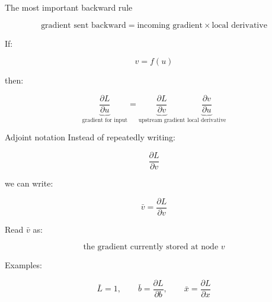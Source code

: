 \documentclass[10pt,aspectratio=169]{beamer}
\newcommand{\grad}[2]{\frac{\partial #1}{\partial #2}}
\newcommand{\adj}[1]{\bar{#1}}
\begin{document}
\begin{frame}[t]{The most important backward rule}
\begin{center}
\Large
\[
\boxed{
\text{gradient sent backward}
=
\text{incoming gradient}
\times
\text{local derivative}
}
\]
\end{center}

\vspace{0.35cm}

If:

\[
v=f(u)
\]

then:

\[
\underbrace{\grad{L}{u}}_{\text{gradient for input}}
=
\underbrace{\grad{L}{v}}_{\text{upstream gradient}}
\;
\underbrace{\grad{v}{u}}_{\text{local derivative}}
\]
\end{frame}

\begin{frame}[t]{Adjoint notation}
Instead of repeatedly writing:

\[
\grad{L}{v}
\]

we can write:

\[
\boxed{
\adj{v}
=
\grad{L}{v}
}
\]

Read \(\adj{v}\) as:

\[
\text{the gradient currently stored at node }v
\]

Examples:

\[
\adj{L}=1,
\qquad
\adj{b}=\grad{L}{b},
\qquad
\adj{x}=\grad{L}{x}
\]
\end{frame}
\end{document}
